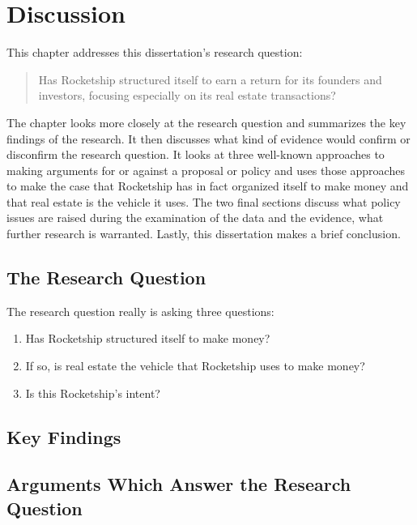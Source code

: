 
\chapter{Discussion}%
\label{ch:discussion}%
\noindent\bigskip%

This chapter addresses this dissertation's research question:
\medskip%
\begin{quote}\OnehalfSpacing
  Has Rocketship structured itself to earn a return for its founders and investors, focusing especially on its real estate transactions?
\end{quote}
The chapter looks more closely at the research question and summarizes the key findings of the research. It then discusses what kind of evidence would confirm or disconfirm the research question. It looks at three well-known approaches to making arguments for or against a proposal or policy and uses those approaches to make the case that Rocketship has in fact organized itself to make money and that real estate is the vehicle it uses. The two final sections discuss what policy issues are raised during the examination of the data and the evidence, what further research is warranted. Lastly, this dissertation makes a brief conclusion.

\section{The Research Question}%
\label{sec:research-question}\indent%

The research question really is asking three questions:
\begin{enumerate}
  \item Has Rocketship structured itself to make money?
  \item If so, is real estate the vehicle that Rocketship uses to make money?
  \item Is this Rocketship's intent?
\end{enumerate}

\section{Key Findings}%
\label{sec:summary-key-findings}\indent%

\section{Arguments Which Answer the Research Question}%
\label{sec:appr-answ-rese-quest}\indent%

